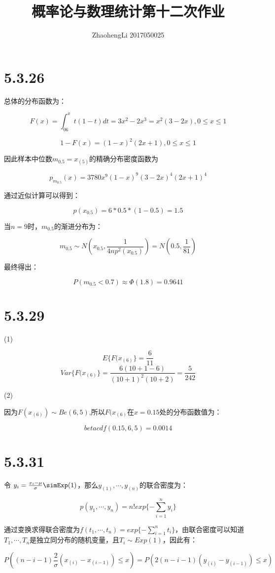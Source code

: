 \documentclass{article}
\title{概率论与数理统计第十二次作业}
\author{ZhaohengLi 2017050025}
\begin{document}
\maketitle

\section{5.3.26}
总体的分布函数为：

$$F(x)=\int^x_06t(1-t)dt=3x^2-2x^3=x^2(3-2x),0\leq x \leq 1$$

$$1-F(x)=(1-x)^2(2x+1),0\leq x \leq 1$$

因此样本中位数$m_{0.5}=x_{(5)}的精确分布密度函数为$

$$p_{m_{0.5}}(x)=3780x^9(1-x)^9(3-2x)^4(2x+1)^4$$

通过近似计算可以得到：

$$p(x_{0.5})=6*0.5*(1-0.5)=1.5$$

当$n=9$时，$m_{0.5}$的渐进分布为：

$$m_{0.5}\sim N(x_{0.5},\frac1{4np^2(x_{0.5})})=N(0.5,\frac1{81})$$

最终得出：

$$P(m_{0.5}<0.7)\approx \Phi (1.8)=0.9641$$

\section{5.3.29}

(1)

$$E\{F(x_{(6)}\}=\frac6{11}$$
$$Var\{F(x_{(6)}\}=\frac{6(10+1-6)}{(10+1)^2(10+2)}=\frac{5}{242}$$

(2)

因为$F(x_{(6)})\sim Be(6,5)$,所以$F(x_{(6)}$在$x=0.15$处的分布函数值为：

$$betacdf(0.15,6,5)=0.0014$$

\section{5.3.31}
令 $y_i=\frac{x_i-\mu}{\sigma}\simExp(1)$，那么$y_{(1)},\cdots,y_{(n)}$的联合密度为：

$$p(y_1,\cdots,y_n)=n!exp\{-\sum^n_{i=1}y_i\}$$

通过变换求得联合密度为$f(t_1,\cdots,t_n)=exp\{-\sum^n_{i=1}t_i\}$，由联合密度可以知道$T_1,\cdots,T_n$是独立同分布的随机变量，且$T_i\sim Exp(1)$，因此有：

$$P((n-i-1)\frac2\sigma(x_{(i)}-x_{(i-1)})\leq x)=P(2(n-i-1)(y_{(i)}-y_{(i-1)})\leq x)$$
\end{document}
